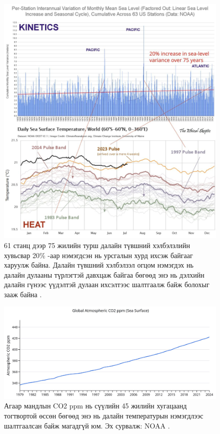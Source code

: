 \documentclass[10pt,twocolumn,letterpaper]{article}
\begin{document}
\begin{figure}[t]
\begin{center}
\includegraphics[width=1\textwidth]{sealevel.jpeg}
\end{center}
   \caption{61 станц дээр 75 жилийн турш далайн түвшний хэлбэлзлийн хувьсвар 20\% -аар нэмэгдсэн нь урсгалын хурд ихсэж байгааг харуулж байна. Далайн түвшний хэлбэлзэл огцом нэмэгдэх нь далайн дулааны түрлэгтэй давхцаж байгаа бөгөөд энэ нь дэлхийн далайн гүнээс үүдэлтэй дулаан ихсэлтээс шалтгаалж байж болохыг зааж байна \cite{2,129}.}
\label{fig:22}
\end{figure}

\begin{figure}[t]
\begin{center}
\includegraphics[width=1\textwidth]{co2.jpg}
\end{center}
   \caption{Агаар мандлын CO2 ppm нь сүүлийн 45 жилийн хугацаанд тогтвортой өссөн бөгөөд энэ нь далайн температурын нэмэгдлээс шалтгаалсан байж магадгүй юм. Эх сурвалж: NOAA \cite{148,129}.}
\label{fig:23}
\end{figure}
\end{document}
